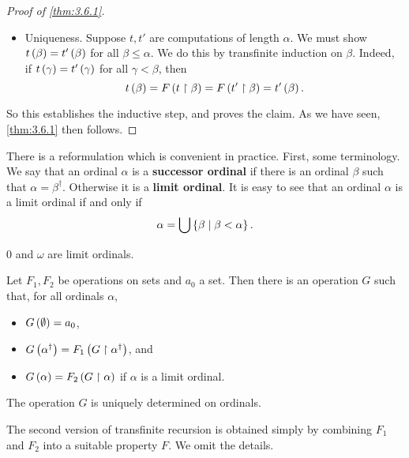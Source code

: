 \begin{proof}[Proof of \ref{thm:3.6.1}]
\begin{itemize}
for all $ \beta < \alpha $. We extend $ s $ to a function $ t $ with domain $ \alpha^\dagger $ by setting $ t\rb{\alpha} = F\rb{s} $. Then for all $ \beta \le \alpha $, we have that $ t\rb{\beta} = F\rb{t \upharpoonright \beta} $. So $ t $ is a computation of length $ \alpha $ based on $ F $.
\item Uniqueness. Suppose $ t, t' $ are computations of length $ \alpha $. We must show $ t\left( \beta \right) = t'\left( \beta \right) $ for all $ \beta \le \alpha $. We do this by transfinite induction on $ \beta $. Indeed, if $ t\left( \gamma \right) = t'\left( \gamma \right) $ for all $ \gamma < \beta $, then
$$ t\left( \beta \right) = F\left( t \upharpoonright \beta \right) = F\left( t' \upharpoonright \beta \right) = t'\left( \beta \right). $$
\end{itemize}
So this establishes the inductive step, and proves the claim. As we have seen, \ref{thm:3.6.1} then follows.
\end{proof}

There is a reformulation which is convenient in practice. First, some terminology. We say that an ordinal $ \alpha $ is a \textbf{successor ordinal} if there is an ordinal $ \beta $ such that $ \alpha = \beta^\dagger $. Otherwise it is a \textbf{limit ordinal}. It is easy to see that an ordinal $ \alpha $ is a limit ordinal if and only if
$$ \alpha = \bigcup \left\{ \beta \mid \beta < \alpha \right\}. $$

\begin{example*}
$ 0 $ and $ \omega $ are limit ordinals.
\end{example*}

\begin{theorem}
Let $ F_1, F_2 $ be operations on sets and $ a_0 $ a set. Then there is an operation $ G $ such that, for all ordinals $ \alpha $,
\begin{itemize}
\item $ G\left( \emptyset \right) = a_0 $,
\item $ G\left( \alpha^\dagger \right) = F_1\left( G \upharpoonright \alpha^\dagger \right) $, and
\item $ G\left( \alpha \right) = F_2\left( G \upharpoonright \alpha \right) $ if $ \alpha $ is a limit ordinal.
\end{itemize}
The operation $ G $ is uniquely determined on ordinals.
\end{theorem}

The second version of transfinite recursion is obtained simply by combining $ F_1 $ and $ F_2 $ into a suitable property $ F $. We omit the details.

